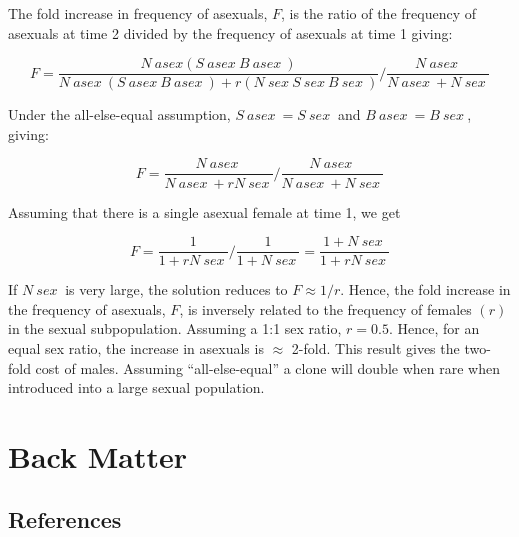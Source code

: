 \documentclass[
  letterpaper,
]{book}
\newlength{\cslhangindent}
\newlength{\cslentryspacingunit} %
\newenvironment{CSLReferences}[2] %
 {%
  \setlength{\parindent}{0pt}
  \ifodd #1
  \let\oldpar\par
  \def\par{\hangindent=\cslhangindent\oldpar}
  \fi
  \setlength{\parskip}{#2\cslentryspacingunit}
 }%
 {}
\begin{document}
\begin{tcolorbox}
The fold increase in frequency of asexuals, \(F\), is the ratio of the
frequency of asexuals at time 2 divided by the frequency of asexuals at
time 1 giving:

\[F = \frac{N~asex(S~asex~B~asex~)}{N~asex~(S~asex~B~asex~) + r(N~sex~S~sex~B~sex~)}/\frac{N~asex~}{N~asex~ + N~sex~}\]

Under the all-else-equal assumption, \(S~asex~ = S~sex~\) and
\(B~asex~ = B~sex~\), giving:

\[F = \frac{N~asex~}{N~asex~ + rN~sex~}/\frac{N~asex~}{N~asex~ + N~sex~}\]

Assuming that there is a single asexual female at time 1, we get

\[F = \frac{1}{1 + rN~sex~}/\frac{1}{1 + N~sex~} = \frac{1 + N~sex~}{1 + rN~sex~}\]

If \(N~sex~\) is very large, the solution reduces to \(F \approx 1/r\).
Hence, the fold increase in the frequency of asexuals, \(F\), is
inversely related to the frequency of females \((r)\) in the sexual
subpopulation. Assuming a 1:1 sex ratio, \(r = 0.5\). Hence, for an
equal sex ratio, the increase in asexuals is \(\approx\) 2-fold. This
result gives the two-fold cost of males. Assuming ``all-else-equal'' a
clone will double when rare when introduced into a large sexual
population.

\end{tcolorbox}


\part{Back Matter}

\hypertarget{references}{%
\chapter*{References}\label{references}}


\hypertarget{refs}{}
\begin{CSLReferences}{0}{0}
\end{CSLReferences}


\backmatter
\end{document}
